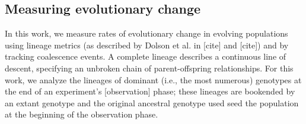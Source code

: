 





\vspace{0.5cm}
\subsection{Measuring evolutionary change}
\label{sec:methods:measuring_evoluationray_change}

In this work, we measure rates of evolutionary change in evolving populations using lineage metrics (as described by Dolson et al. in [cite] and [cite]) and by tracking coalescence events. 
A complete lineage describes a continuous line of descent, specifying an unbroken chain of parent-offspring relationships.
For this work, we analyze the lineages of dominant (i.e., the most numerous) genotypes at the end of an experiment's [observation] phase; these lineages are bookended by an extant genotype and the original ancestral genotype used seed the population at the beginning of the observation phase. 

